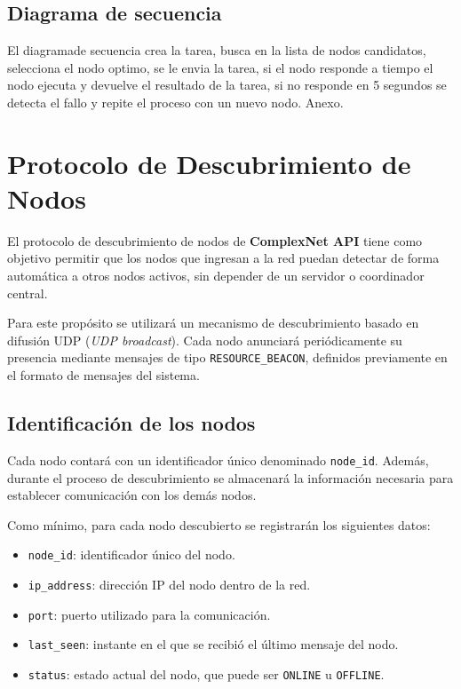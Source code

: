 \documentclass{article}
\begin{document}
\subsection{Diagrama de secuencia}
El diagramade secuencia crea la tarea, busca en la lista de nodos candidatos, selecciona el nodo optimo, se le envia la tarea, si el nodo responde a tiempo el nodo ejecuta y devuelve el resultado de la tarea, si no responde en 5 segundos se detecta el fallo y repite el proceso con un nuevo nodo. Anexo.
\section{Protocolo de Descubrimiento de Nodos}

El protocolo de descubrimiento de nodos de \textbf{ComplexNet API} tiene como objetivo permitir que los nodos que ingresan a la red puedan detectar de forma automática a otros nodos activos, sin depender de un servidor o coordinador central.

Para este propósito se utilizará un mecanismo de descubrimiento basado en difusión UDP (\textit{UDP broadcast}). Cada nodo anunciará periódicamente su presencia mediante mensajes de tipo \texttt{RESOURCE\_BEACON}, definidos previamente en el formato de mensajes del sistema.

\subsection{Identificación de los nodos}

Cada nodo contará con un identificador único denominado \texttt{node\_id}. Además, durante el proceso de descubrimiento se almacenará la información necesaria para establecer comunicación con los demás nodos.

Como mínimo, para cada nodo descubierto se registrarán los siguientes datos:

\begin{itemize}
    \item \texttt{node\_id}: identificador único del nodo.
    \item \texttt{ip\_address}: dirección IP del nodo dentro de la red.
    \item \texttt{port}: puerto utilizado para la comunicación.
    \item \texttt{last\_seen}: instante en el que se recibió el último mensaje del nodo.
    \item \texttt{status}: estado actual del nodo, que puede ser \texttt{ONLINE} u \texttt{OFFLINE}.
\end{itemize}
\end{document}
